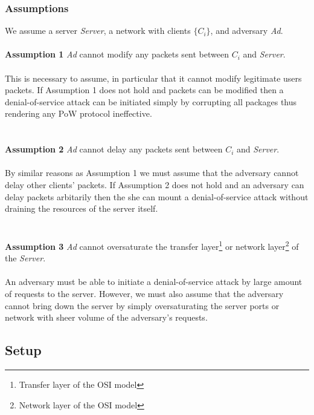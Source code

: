 \subsubsection{Assumptions}
We assume a server \emph{Server}, a network with clients \emph{$\{C_i\}$}, and adversary \emph{Ad}.
\\
\\
\noindent \textbf{Assumption 1} \indent \emph{Ad} cannot modify any packets sent between \emph{$C_i$} and \emph{Server}.
\\
\\
This is necessary to assume, in particular that it cannot modify legitimate users packets. If Assumption 1 does not hold and packets can be modified then a denial-of-service attack can be initiated simply by corrupting all packages thus rendering any PoW protocol ineffective.
\\
\\
\\
\noindent \textbf{Assumption 2} \indent \emph{Ad} cannot delay any packets sent between \emph{$C_i$} and \emph{Server}.
\\
\\
By similar reasons as Assumption 1 we must assume that the adversary cannot delay other clients' packets. If Assumption 2 does not hold and an adversary can delay packets arbitarily then the she can mount a denial-of-service attack without draining the resources of the server itself.
\\
\\
\\
\noindent \textbf{Assumption 3} \indent \emph{Ad} cannot oversaturate the transfer layer\footnote{Transfer layer of the OSI model} or network layer\footnote{Network layer of the OSI model} of the \emph{Server}.
\\
\\
An adversary must be able to initiate a denial-of-service attack by large amount of requests to the server. However, we must also assume that the adversary cannot bring down the server by simply oversaturating the server ports or network with sheer volume of the adversary's requests.

\subsection{Setup}